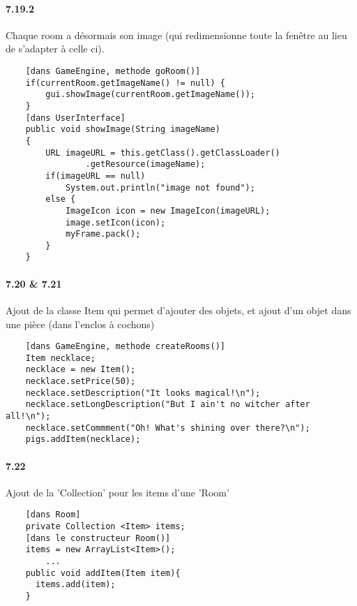 \documentclass[11pt,a4paper]{report}
\begin{document}
\paragraph{7.19.2}
Chaque room a désormais son image (qui redimensionne toute la fenêtre au lieu de s'adapter à celle ci).
\newpage
\begin{lstlisting}
    [dans GameEngine, methode goRoom()]
    if(currentRoom.getImageName() != null) {
    	gui.showImage(currentRoom.getImageName());
    }
    [dans UserInterface]
    public void showImage(String imageName)
    {
        URL imageURL = this.getClass().getClassLoader()
        		.getResource(imageName);
        if(imageURL == null)
            System.out.println("image not found");
        else {
            ImageIcon icon = new ImageIcon(imageURL);
            image.setIcon(icon);
            myFrame.pack();
        }
    }
\end{lstlisting}

\paragraph{7.20 \& 7.21}
Ajout de la classe Item qui permet d'ajouter des objets, et ajout d'un objet dans une pièce (dans l'enclos à cochons)
\begin{lstlisting}
    [dans GameEngine, methode createRooms()]
    Item necklace;
    necklace = new Item();
    necklace.setPrice(50);
    necklace.setDescription("It looks magical!\n");
    necklace.setLongDescription("But I ain't no witcher after all!\n");
    necklace.setCommment("Oh! What's shining over there?\n");
    pigs.addItem(necklace);
\end{lstlisting}

\paragraph{7.22}

Ajout de la 'Collection' pour les items d'une 'Room'
\begin{lstlisting}
    [dans Room]
    private Collection <Item> items;
    [dans le constructeur Room()]
    items = new ArrayList<Item>();
		...
    public void addItem(Item item){
      items.add(item);
    }
\end{lstlisting}
\end{document}
